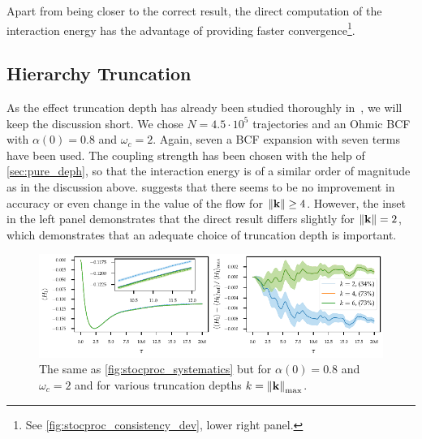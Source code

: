 Apart from being closer to the correct result, the direct computation
of the interaction energy has the advantage of providing faster
convergence\footnote{See \cref{fig:stocproc_consistency_dev}, lower right
  panel.}.

\subsection{Hierarchy Truncation}
\label{sec:trunc}
As the effect truncation depth has already been studied thoroughly
in~\cite{RichardDiss}, we will keep the discussion short.  We chose
\(N=4.5 \cdot 10^5\) trajectories and an Ohmic BCF with \(α(0)=0.8\)
and \(ω_c=2\). Again, seven a BCF expansion with seven terms have been
used. The coupling strength has been chosen with the help of
\cref{sec:pure_deph}, so that the interaction energy is of a similar
order of magnitude as in the discussion
above.  suggests that there seems to be no
improvement in accuracy or even change in the value of the flow for
\(\norm{\vb{k}}\geq 4\). However, the inset in the left panel
demonstrates that the direct result differs slightly for
\(\norm{\vb{k}} = 2\), which demonstrates that an adequate choice of
truncation depth is important.
\begin{figure}[htp]
  \centering
  \includegraphics{figs/one_bath_syst/k_systematics_interaction}
  \caption{\label{fig:k_systematics} The same as
    \cref{fig:stocproc_systematics} but for \(α(0)=0.8\) and
    \(ω_c=2\) and for various truncation depths \(k=\norm{\vb{k}}_{\mathrm{max}}\).}
\end{figure}


